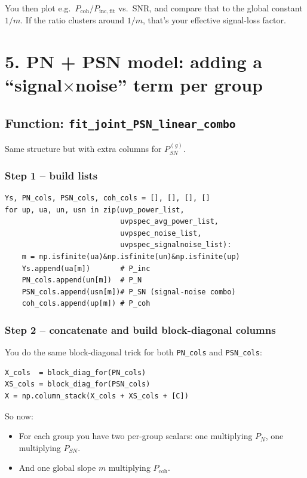 \documentclass[11pt]{article}
\begin{document}
You then plot e.g.\ $P_{\mathrm{coh}} / P_{\mathrm{inc,fit}}$ vs.\ SNR, and compare that to the global constant $1/m$. If the ratio clusters around $1/m$, that’s your effective signal-loss factor.

\section*{5. PN + PSN model: adding a ``signal$\times$noise'' term per group}

\subsection*{Function: \texttt{fit\_joint\_PSN\_linear\_combo}}

Same structure but with extra columns for $P_{SN}^{(g)}$.

\subsubsection*{Step 1 -- build lists}

\begin{verbatim}
Ys, PN_cols, PSN_cols, coh_cols = [], [], [], []
for up, ua, un, usn in zip(uvp_power_list,
                           uvpspec_avg_power_list,
                           uvpspec_noise_list,
                           uvpspec_signalnoise_list):
    m = np.isfinite(ua)&np.isfinite(un)&np.isfinite(up)
    Ys.append(ua[m])       # P_inc
    PN_cols.append(un[m])  # P_N
    PSN_cols.append(usn[m])# P_SN (signal-noise combo)
    coh_cols.append(up[m]) # P_coh
\end{verbatim}

\subsubsection*{Step 2 -- concatenate and build block-diagonal columns}

You do the same block-diagonal trick for both \texttt{PN\_cols} and \texttt{PSN\_cols}:

\begin{verbatim}
X_cols  = block_diag_for(PN_cols)
XS_cols = block_diag_for(PSN_cols)
X = np.column_stack(X_cols + XS_cols + [C])
\end{verbatim}

So now:

\begin{itemize}[leftmargin=*]
  \item For each group you have two per-group scalars: one multiplying $P_N$, one multiplying $P_{SN}$.
  \item And one global slope $m$ multiplying $P_{\mathrm{coh}}$.
\end{itemize}
\end{document}

